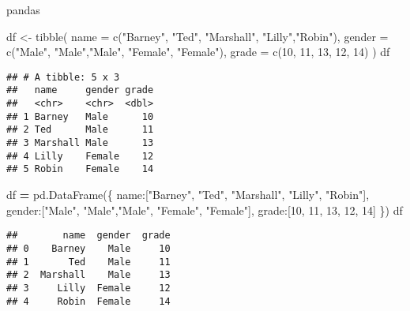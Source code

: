 \documentclass[
]{book}
\newenvironment{Shaded}{\begin{snugshade}}{\end{snugshade}}
\newcommand{\AttributeTok}[1]{\textcolor[rgb]{0.77,0.63,0.00}{#1}}
\newcommand{\DecValTok}[1]{\textcolor[rgb]{0.00,0.00,0.81}{#1}}
\newcommand{\FunctionTok}[1]{\textcolor[rgb]{0.00,0.00,0.00}{#1}}
\newcommand{\NormalTok}[1]{#1}
\newcommand{\OperatorTok}[1]{\textcolor[rgb]{0.81,0.36,0.00}{\textbf{#1}}}
\newcommand{\OtherTok}[1]{\textcolor[rgb]{0.56,0.35,0.01}{#1}}
\newcommand{\StringTok}[1]{\textcolor[rgb]{0.31,0.60,0.02}{#1}}
\begin{document}
pandas

\begin{Shaded}
\begin{Highlighting}[]
\NormalTok{df }\OtherTok{\textless{}{-}} \FunctionTok{tibble}\NormalTok{(}
  \AttributeTok{name =} \FunctionTok{c}\NormalTok{(}\StringTok{"Barney"}\NormalTok{, }\StringTok{"Ted"}\NormalTok{, }\StringTok{"Marshall"}\NormalTok{,}
           \StringTok{"Lilly"}\NormalTok{,}\StringTok{"Robin"}\NormalTok{),}
  \AttributeTok{gender =} \FunctionTok{c}\NormalTok{(}\StringTok{"Male"}\NormalTok{, }\StringTok{"Male"}\NormalTok{,}\StringTok{"Male"}\NormalTok{,}
             \StringTok{"Female"}\NormalTok{, }\StringTok{"Female"}\NormalTok{),}
  \AttributeTok{grade =} \FunctionTok{c}\NormalTok{(}\DecValTok{10}\NormalTok{, }\DecValTok{11}\NormalTok{, }\DecValTok{13}\NormalTok{, }\DecValTok{12}\NormalTok{, }\DecValTok{14}\NormalTok{)}
\NormalTok{)}
\NormalTok{df}
\end{Highlighting}
\end{Shaded}

\begin{verbatim}
## # A tibble: 5 x 3
##   name     gender grade
##   <chr>    <chr>  <dbl>
## 1 Barney   Male      10
## 2 Ted      Male      11
## 3 Marshall Male      13
## 4 Lilly    Female    12
## 5 Robin    Female    14
\end{verbatim}

\begin{Shaded}
\begin{Highlighting}[]
\NormalTok{df }\OperatorTok{=}\NormalTok{ pd.DataFrame(\{}
  \StringTok{\textquotesingle{}name\textquotesingle{}}\NormalTok{:[}\StringTok{"Barney"}\NormalTok{, }\StringTok{"Ted"}\NormalTok{, }\StringTok{"Marshall"}\NormalTok{,}
          \StringTok{"Lilly"}\NormalTok{, }\StringTok{"Robin"}\NormalTok{],}
  \StringTok{\textquotesingle{}gender\textquotesingle{}}\NormalTok{:[}\StringTok{"Male"}\NormalTok{, }\StringTok{"Male"}\NormalTok{,}\StringTok{"Male"}\NormalTok{, }
            \StringTok{"Female"}\NormalTok{, }\StringTok{"Female"}\NormalTok{],}
  \StringTok{\textquotesingle{}grade\textquotesingle{}}\NormalTok{:[}\DecValTok{10}\NormalTok{, }\DecValTok{11}\NormalTok{, }\DecValTok{13}\NormalTok{, }\DecValTok{12}\NormalTok{, }\DecValTok{14}\NormalTok{] }
\NormalTok{\})}
\NormalTok{df}
\end{Highlighting}
\end{Shaded}

\begin{verbatim}
##        name  gender  grade
## 0    Barney    Male     10
## 1       Ted    Male     11
## 2  Marshall    Male     13
## 3     Lilly  Female     12
## 4     Robin  Female     14
\end{verbatim}
\end{document}
